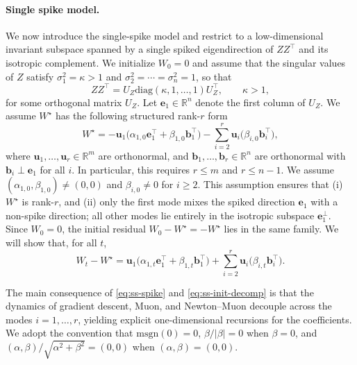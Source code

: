 \documentclass[11pt]{article}
\newcommand{\R}{\mathbb{R}}
\begin{document}
\paragraph{Single spike model.} We now introduce the single-spike model and restrict to a low-dimensional invariant subspace spanned by a single spiked eigendirection of ${Z}{Z}^\top$ and its isotropic complement.
We initialize ${W}_0=0$ and assume that the singular values of ${Z}$ satisfy $\sigma_1^2=\kappa>1$ and $\sigma_2^2=\cdots=\sigma_n^2=1$, so that
\begin{equation}
  \label{eq:ss-spike}
  {Z}{Z}^\top = {U}_{Z}\mathrm{diag}(\kappa,1,\ldots,1){U}_{Z}^\top,
  \qquad \kappa>1,
\end{equation}
for some orthogonal matrix ${U}_{Z}$. Let $\boldsymbol{e}_1\in\R^n$ denote the first column of $U_Z$. We assume \(W^\star\) has the following structured rank-$r$ form
\begin{equation}
  \label{eq:ss-init-decomp}
  W^\star
  =
  -\boldsymbol{u}_1 \big(\alpha_{1,0} \boldsymbol{e}_1^\top + \beta_{1,0} \boldsymbol{b}_1^\top\big)
  -
  \sum_{i=2}^r \boldsymbol{u}_i \big(\beta_{i,0} \boldsymbol{b}_i^\top\big),
\end{equation}
where $\boldsymbol{u}_1,\dots,\boldsymbol{u}_r\in\R^m$ are orthonormal, and $\boldsymbol{b}_1,\dots,\boldsymbol{b}_r\in\R^n$ are orthonormal with $\boldsymbol{b}_i\perp \boldsymbol{e}_1$ for all $i$. In particular, this requires $r\le m$ and $r\le n-1$. We assume $(\alpha_{1,0},\beta_{1,0})\neq(0,0)$ and $\beta_{i,0}\neq 0$ for $i\ge 2$.
This assumption ensures that (i) $W^\star$ is rank-$r$, and (ii) only the first mode mixes the spiked direction $\boldsymbol{e}_1$ with a non-spike direction; all other modes lie entirely in the isotropic subspace $\boldsymbol{e}_1^\perp$.
Since ${W}_0=0$, the initial residual ${W}_0-W^\star=-W^\star$ lies in the same family. We will show that, for all $t$,
\begin{equation}
  \label{eq:ss-residual-decomp}
  W_t-W^\star
  =
  \boldsymbol{u}_1 \big(\alpha_{1,t} \boldsymbol{e}_1^\top + \beta_{1,t} \boldsymbol{b}_1^\top\big)
  +
  \sum_{i=2}^r \boldsymbol{u}_i \big(\beta_{i,t} \boldsymbol{b}_i^\top\big).
\end{equation}

The main consequence of \eqref{eq:ss-spike} and \eqref{eq:ss-init-decomp} is that the dynamics of gradient descent, Muon, and Newton--Muon decouple across the modes $i=1,\dots,r$, yielding explicit one-dimensional recursions for the coefficients. We adopt the convention that $\mathrm{msgn}(0)=0$, $\beta/|\beta|=0$ when $\beta=0$, and $(\alpha,\beta)/\sqrt{\alpha^2+\beta^2}=(0,0)$ when $(\alpha,\beta)=(0,0)$.
\end{document}
